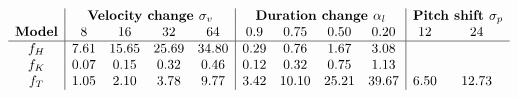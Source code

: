 \[\begin{array}{c|cccc|cccc|cc}
      & \multicolumn{4}{c|}{\textbf{Velocity change }\sigma_v} & \multicolumn{4}{c|}{\textbf{Duration change }\alpha_l} & \multicolumn{2}{c}{\textbf{Pitch shift }\sigma_p}\\
      \textbf{Model} & 8    & 16   & 32   & 64   & 0.9  & 0.75  & 0.50  & 0.20  & 12   & 24    \\ \hline
      f_H & 7.61 & 15.65 & 25.69 & 34.80 & 0.29 & 0.76 & 1.67 & 3.08 & \multicolumn{2}{c}{} \\
      f_K & 0.07 & 0.15 & 0.32 & 0.46 & 0.12 & 0.32 & 0.75 & 1.13 & \multicolumn{2}{c}{} \\
      f_T & 1.05 & 2.10 & 3.78 & 9.77 & 3.42 & 10.10 & 25.21 & 39.67 & 6.50 & 12.73
\end{array}\]